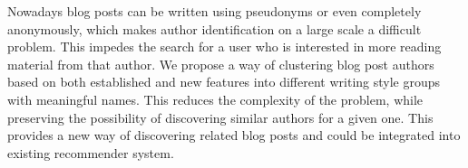 
Nowadays blog posts can be written using pseudonyms or even completely anonymously, which makes author identification on a large scale a difficult problem. %
This impedes the search for a user who is interested in more reading material from that author. %
We propose a way of clustering blog post authors based on both established and new features into different writing style groups with meaningful names.
This reduces the complexity of the problem, while preserving the possibility of discovering similar authors for a given one. %
This provides a new way of discovering related blog posts and could be integrated into existing recommender system. %


